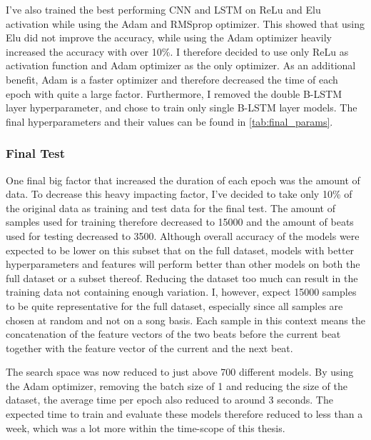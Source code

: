 I've also trained the best performing CNN and LSTM on ReLu and Elu activation while using the Adam and RMSprop optimizer. This showed that using Elu did not improve the accuracy, while using the Adam optimizer heavily increased the accuracy with over 10\%. I therefore decided to use only ReLu as activation function and Adam optimizer as the only optimizer. As an additional benefit, Adam is a faster optimizer and therefore decreased the time of each epoch with quite a large factor. Furthermore, I removed the double B-LSTM layer hyperparameter, and chose to train only single B-LSTM layer models. The final hyperparameters and their values can be found in \autoref{tab:final_params}.

\subsubsection{Final Test}

One final big factor that increased the duration of each epoch was the amount of data. To decrease this heavy impacting factor, I've decided to take only 10\% of the original data as training and test data for the final test. The amount of samples used for training therefore decreased to 15000 and the amount of beats used for testing decreased to 3500. Although overall accuracy of the models were expected to be lower on this subset that on the full dataset, models with better hyperparameters and features will perform better than other models on both the full dataset or a subset thereof. Reducing the dataset too much can result in the training data not containing enough variation. I, however, expect 15000 samples to be quite representative for the full dataset, especially since all samples are chosen at random and not on a song basis. Each sample in this context means the concatenation of the feature vectors of the two beats before the current beat together with the feature vector of the current and the next beat.

The search space was now reduced to just above 700 different models. By using the Adam optimizer, removing the batch size of 1 and reducing the size of the dataset, the average time per epoch also reduced to around 3 seconds. The expected time to train and evaluate these models therefore reduced to less than a week, which was a lot more within the time-scope of this thesis. 


